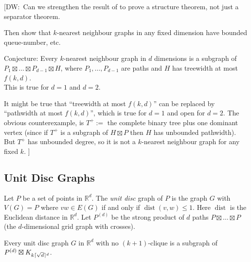 \documentclass{patmorin}
\newcommand{\note}[2]{{\color{red}[#1:~#2]}}
\DeclareMathOperator{\dist}{dist}
\DeclarePairedDelimiter{\ceil}{\lceil}{\rceil}
\renewcommand{\leq}{\leqslant}
\begin{document}
\note{DW}{Can we strengthen the result of \citep{MTTV97} to prove a structure theorem, not just a separator theorem. 

Then show that $k$-nearest neighbour graphs in any fixed dimension have bounded queue-number, etc.

Conjecture: Every $k$-nearest neighbour graph in $d$ dimensions is a subgraph of $P_1 \boxtimes\dots \boxtimes P_{d-1} \boxtimes H$, where $P_1,\dots,P_{d-1}$ are paths and $H$ has
treewidth at most $f(k,d)$.\\ This  is true for $d=1$ and $d=2$.

It might be true that ``treewidth at most $f(k,d)$'' can be replaced by ``pathwidth at most $f(k,d)$'', which is true for $d=1$ and open for $d=2$. The obvious counterexample, is $T^+:=$ the complete binary tree plus one dominant vertex (since if $T^+$ is a subgraph of $H\boxtimes P$ then $H$ has unbounded pathwidth). But $T^+$ has unbounded degree, so it is not  a $k$-nearest neighbour graph for any fixed $k$. 
}


\subsection{Unit Disc Graphs}

Let $P$ be a set of points in $\mathbb{R}^d$. The \emph{unit disc} graph of $P$ is the graph $G$ with $V(G)=P$ where $vw\in E(G)$ if and only if $\dist(v,w)\leq 1$. Here $\dist$ is the Euclidean distance in $\mathbb{R}^d$. Let $P^{(d)}$ be the strong product of $d$ paths $P\boxtimes \dots \boxtimes P$ (the $d$-dimensional grid graph with crosses). 

\begin{lem}
\label{UnitDiscGraph}
Every unit disc graph $G$ in $\mathbb{R}^d$ with no $(k+1)$-clique is a subgraph of 
$P^{(d)} \boxtimes K_{k \ceil{\sqrt{d}}^d}$.
\end{lem}
\end{document}
